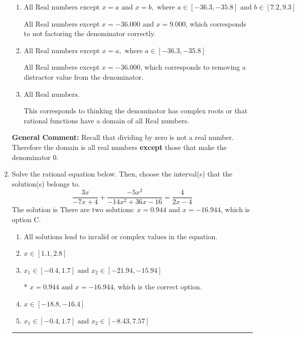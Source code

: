 \documentclass{extbook}[14pt]
\newcommand{\litem}[1]{\item #1

\rule{\textwidth}{0.4pt}}
\begin{document}
\begin{enumerate}
{\begin{enumerate}[label=\Alph*.]
All Real numbers except $x = -1.000$ and $x = 1.000$, which is the correct option.
\item \( \text{All Real numbers except } x = a \text{ and } x = b, \text{ where } a \in [-36.3, -35.8] \text{ and } b \in [7.2, 9.3] \)

All Real numbers except $x = -36.000$ and $x = 9.000$, which corresponds to not factoring the denominator correctly.
\item \( \text{All Real numbers except } x = a, \text{ where } a \in [-36.3, -35.8] \)

All Real numbers except $x = -36.000$, which corresponds to removing a distractor value from the denominator.
\item \( \text{All Real numbers.} \)

This corresponds to thinking the denominator has complex roots or that rational functions have a domain of all Real numbers.
\end{enumerate}

\textbf{General Comment:} Recall that dividing by zero is not a real number. Therefore the domain is all real numbers \textbf{except} those that make the denominator 0.
}
\litem{
Solve the rational equation below. Then, choose the interval(s) that the solution(s) belongs to.
\[ \frac{3x}{-7x + 4} + \frac{-5x^{2}}{-14x^{2} +36 x -16} = \frac{4}{2x -4} \]The solution is \( \text{There are two solutions: } x = 0.944 \text{ and } x = -16.944 \), which is option C.\begin{enumerate}[label=\Alph*.]
\item \( \text{All solutions lead to invalid or complex values in the equation.} \)


\item \( x \in [1.1,2.8] \)


\item \( x_1 \in [-0.4, 1.7] \text{ and } x_2 \in [-21.94,-15.94] \)

* $x = 0.944 \text{ and } x = -16.944$, which is the correct option.
\item \( x \in [-18.8,-16.4] \)


\item \( x_1 \in [-0.4, 1.7] \text{ and } x_2 \in [-8.43,7.57] \)


\end{enumerate}

}
\end{enumerate}
\end{document}
